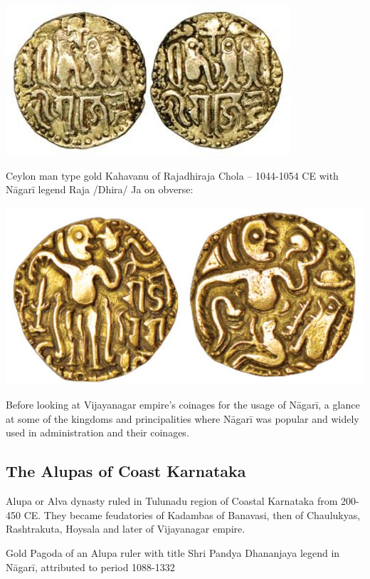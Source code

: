 \centerline{\includegraphics[scale=0.45]{"images/article-06/art06-fig13.jpg"}}

Ceylon man type gold Kahavanu of Rajadhiraja Chola – 1044-1054 CE with Nāgarī legend Raja /Dhira/ Ja on obverse:

\centerline{\includegraphics[scale=0.45]{"images/article-06/art06-fig14.jpg"}}

Before looking at Vijayanagar empire’s coinages for the usage of Nāgarī, a glance at some of the kingdoms and principalities where Nāgarī was popular and widely used in administration and their coinages.


\subsection*{The Alupas of Coast Karnataka}

Alupa or Alva dynasty ruled in Tulunadu region of Coastal Karnataka from 200-450 CE. They became feudatories of Kadambas of Banavasi, then of Chaulukyas, Rashtrakuta, Hoysala and later of Vijayanagar empire.

Gold Pagoda of an Alupa ruler with title Shri Pandya Dhananjaya legend in Nāgarī, attributed to period 1088-1332

